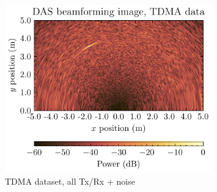 \documentclass[UKenglish,8pt,aspectratio=1610]{beamer}
\begin{document}
\begin{frame}
\begin{columns}
\begin{column}{0.5\textwidth}
		\begin{figure}[h!]
			\includegraphics[width=0.8\textwidth]{question3/TDMA_DAS_image_with_noise.pdf}
			\centering
			\caption{TDMA dataset,  all Tx/Rx + noise}
		\end{figure}
	\end{column}
\end{columns}
\end{frame}
\end{document}
